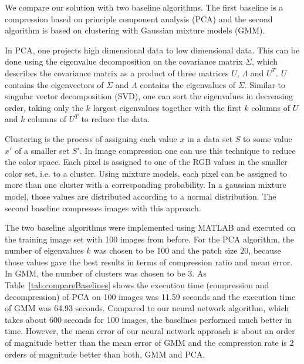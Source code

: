 We compare our solution with two baseline algorithms. The first baseline is a compression based on principle component analysis (PCA) and the second algorithm is based on clustering with Gaussian mixture models (GMM).  

In PCA, one projects high dimensional data to low dimensional data. This can be done using the eigenvalue decomposition on the covariance matrix $\Sigma$, which describes the covariance matrix as a product of three matrices \(U\), $\Lambda$ and $U^T$. \(U\) contains the eigenvectors of  $\Sigma$ and $\Lambda$ contains the eigenvalues of $\Sigma$. Similar to singular vector decomposition (SVD), one can sort the eigenvalues in decreasing order, taking only the \(k\) largest eigenvalues together with the first \(k\) columns of \(U\) and \(k\) columns of \(U^T\) to reduce the data. 

Clustering is the process of assigning each value \(x\) in a data set \(S\) to some value \(x'\) of a smaller set \(S'\). In image compression one can use this technique to reduce the color space. Each pixel is assigned to one of the RGB values in the smaller color set, i.e. to a cluster. Using mixture models, each pixel can be assigned to more than one cluster with a corresponding probability. In a gaussian mixture model, those values are distributed according to a normal distribution. The second baseline compresses images with this approach. 

The two baseline algorithms were implemented using MATLAB and executed on the training image set with 100 images from before. For the PCA algorithm, the number of eigenvalues \(k\) was chosen to be 100 and the patch size 20, because those values gave the best results in terms of compression ratio and mean error. In GMM, the number of clusters was chosen to be 3. As Table~\ref{tab:compareBaselines} shows the execution time (compression and decompression) of PCA on 100 images was 11.59 seconds and the execution time of GMM was 64.93 seconds. Compared to our neural network algorithm, which takes about 600 seconds for 100 images, the baselines performed much better in time. However, the mean error of our neural network approach is about an order of magnitude better than the mean error of GMM and the compression rate is 2 orders of magnitude better than both, GMM and PCA.





